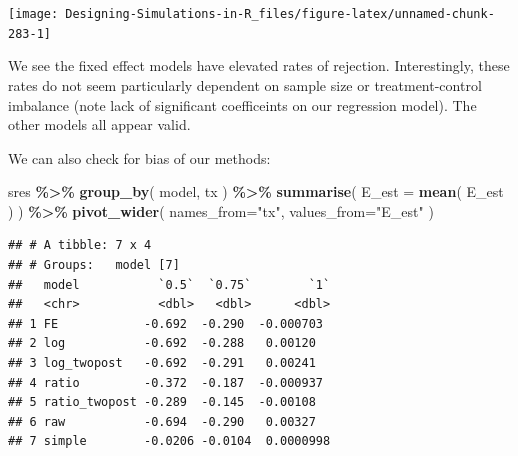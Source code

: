 \documentclass[
]{book}
\newenvironment{Shaded}{\begin{snugshade}}{\end{snugshade}}
\newcommand{\AttributeTok}[1]{\textcolor[rgb]{0.13,0.29,0.53}{#1}}
\newcommand{\DecValTok}[1]{\textcolor[rgb]{0.00,0.00,0.81}{#1}}
\newcommand{\FloatTok}[1]{\textcolor[rgb]{0.00,0.00,0.81}{#1}}
\newcommand{\FunctionTok}[1]{\textcolor[rgb]{0.13,0.29,0.53}{\textbf{#1}}}
\newcommand{\NormalTok}[1]{#1}
\newcommand{\SpecialCharTok}[1]{\textcolor[rgb]{0.81,0.36,0.00}{\textbf{#1}}}
\newcommand{\StringTok}[1]{\textcolor[rgb]{0.31,0.60,0.02}{#1}}
\begin{document}
\begin{Shaded}
\end{Shaded}

\begin{center}\texttt{[image: Designing-Simulations-in-R\_files/figure-latex/unnamed-chunk-283-1]} \end{center}

We see the fixed effect models have elevated rates of rejection.
Interestingly, these rates do not seem particularly dependent on sample size or treatment-control imbalance (note lack of significant coefficeints on our regression model).
The other models all appear valid.

We can also check for bias of our methods:

\begin{Shaded}
\begin{Highlighting}[]
\NormalTok{sres }\SpecialCharTok{\%\textgreater{}\%} \FunctionTok{group\_by}\NormalTok{( model, tx ) }\SpecialCharTok{\%\textgreater{}\%}
  \FunctionTok{summarise}\NormalTok{( }\AttributeTok{E\_est =} \FunctionTok{mean}\NormalTok{( E\_est ) ) }\SpecialCharTok{\%\textgreater{}\%}
  \FunctionTok{pivot\_wider}\NormalTok{( }\AttributeTok{names\_from=}\StringTok{"tx"}\NormalTok{, }\AttributeTok{values\_from=}\StringTok{"E\_est"}\NormalTok{ )}
\end{Highlighting}
\end{Shaded}

\begin{verbatim}
## # A tibble: 7 x 4
## # Groups:   model [7]
##   model           `0.5`  `0.75`        `1`
##   <chr>           <dbl>   <dbl>      <dbl>
## 1 FE            -0.692  -0.290  -0.000703 
## 2 log           -0.692  -0.288   0.00120  
## 3 log_twopost   -0.692  -0.291   0.00241  
## 4 ratio         -0.372  -0.187  -0.000937 
## 5 ratio_twopost -0.289  -0.145  -0.00108  
## 6 raw           -0.694  -0.290   0.00327  
## 7 simple        -0.0206 -0.0104  0.0000998
\end{verbatim}
\end{document}
